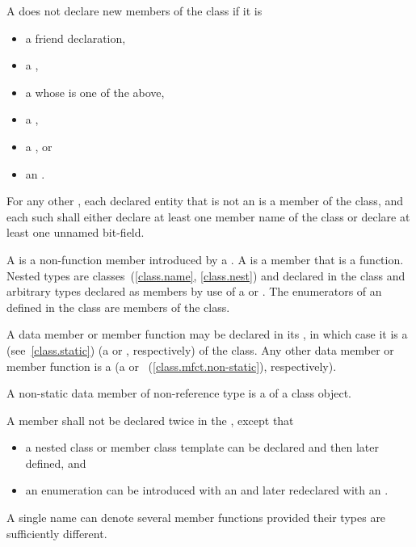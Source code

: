 \pnum
A  does not declare new members of the class
if it is
\begin{itemize}
\item a friend declaration,
\item a ,
\item a  whose  is one of the above,
\item a ,
\item a , or
\item an .
\end{itemize}
For any other ,
each declared entity
that is not an 
is a member of the class,
and each such 
shall either
declare at least one member name of the class
or declare at least one unnamed bit-field.

\pnum
A  is a non-function member introduced by a
.
A  is a member that is a function.
Nested types are classes~(\ref{class.name}, \ref{class.nest}) and
 declared in the class and arbitrary types
declared as members by use of a 
or .
The enumerators of an  defined in the class
are members of the class.

\pnum
A data member or member function
may be declared  in its ,
in which case it is a  (see~\ref{class.static})
(a  or
, respectively)
of the class.
Any other data member or member function is a 
(a  or
~(\ref{class.mfct.non-static}), respectively).
\begin{note}
A non-static data member of non-reference
type is a  of a class object.
\end{note}

\pnum
A member shall not be declared twice in the
, except that
\begin{itemize}
\item a nested class or member
class template can be declared and then later defined, and
\item an
enumeration can be introduced with an  and later
redeclared with an .
\end{itemize}
\begin{note}
A single name can denote several member functions provided their types
are sufficiently different.
\end{note}

